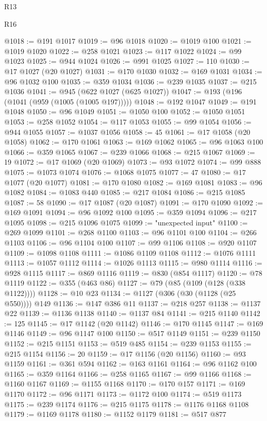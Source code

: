 \begin{lexlean}{R13}
\begin{lexlean}{R16}
\begin{coremodule}
{{{{{{{{{{{{{{{{{{{{{{{{{{{{{{{{{{{{{{{{{{{{{{{{{{{{{{{{{{{{{{{{{{{{{{{{{{{{{{{{{{{{{{{{{{{{{{{{{{{{{{{{{{{{{{{{{@1018 := @191 @1017
@1019 := @96 @1018
@1020 := @1019 @100
@1021 := @1019 @1020
@1022 := @258 @1021
@1023 := @117 @1022
@1024 := @99 @1023
@1025 := @944 @1024
@1026 := @991 @1025
@1027 := 110
@1030 := @17 @1027 (@20 @1027)
@1031 := @170 @1030
@1032 := @169 @1031
@1034 := @96 @1032 @100
@1035 := @359 @1034
@1036 := @239 @1035
@1037 := @215 @1036
@1041 := @945 (@622 @1027 (@625 @1027))
@1047 := @193 (@196 (@1041 (@959 (@1005 (@1005 @197)))))
@1048 := @192 @1047
@1049 := @191 @1048
@1050 := @96 @1049
@1051 := @1050 @100
@1052 := @1050 @1051
@1053 := @258 @1052
@1054 := @117 @1053
@1055 := @99 @1054
@1056 := @944 @1055
@1057 := @1037 @1056
@1058 := 45
@1061 := @17 @1058 (@20 @1058)
@1062 := @170 @1061
@1063 := @169 @1062
@1065 := @96 @1063 @100
@1066 := @359 @1065
@1067 := @239 @1066
@1068 := @215 @1067
@1069 := 19
@1072 := @17 @1069 (@20 @1069)
@1073 := @93 @1072
@1074 := @99 @888
@1075 := @1073 @1074
@1076 := @1068 @1075
@1077 := 47
@1080 := @17 @1077 (@20 @1077)
@1081 := @170 @1080
@1082 := @169 @1081
@1083 := @96 @1082
@1084 := @1083 @440
@1085 := @217 @1084
@1086 := @215 @1085
@1087 := 58
@1090 := @17 @1087 (@20 @1087)
@1091 := @170 @1090
@1092 := @169 @1091
@1094 := @96 @1092 @100
@1095 := @359 @1094
@1096 := @217 @1095
@1098 := @215 @1096 @1075
@1099 := "unexpected input"
@1100 := @269 @1099
@1101 := @268 @1100
@1103 := @96 @1101 @100
@1104 := @266 @1103
@1106 := @96 @1104 @100
@1107 := @99 @1106
@1108 := @920 @1107
@1109 := @1098 @1108
@1111 := @1086 @1109 @1108
@1112 := @1076 @1111
@1113 := @1057 @1112
@1114 := @1026 @1113
@1115 := @980 @1114
@1116 := @928 @1115
@1117 := @869 @1116
@1119 := @830 (@854 @1117)
@1120 := @78 @1119
@1122 := @355 (@463 @86)
@1127 := @79 (@85 (@109 (@128 (@338 @1122))))
@1128 := @10 @23
@1134 := @1127 (@306 (@30 (@1128 (@25 @550)))) @149
@1136 := @147 @386 @11
@1137 := @218 @257
@1138 := @1137 @22
@1139 := @1136 @1138
@1140 := @1137 @84
@1141 := @215 @1140
@1142 := 125
@1145 := @17 @1142 (@20 @1142)
@1146 := @170 @1145
@1147 := @169 @1146
@1149 := @96 @1147 @100
@1150 := @517 @1149
@1151 := @239 @1150
@1152 := @215 @1151
@1153 := @519 @485
@1154 := @239 @1153
@1155 := @215 @1154
@1156 := 20
@1159 := @17 @1156 (@20 @1156)
@1160 := @93 @1159
@1161 := @361 @594
@1162 := @163 @1161
@1164 := @96 @1162 @100
@1165 := @359 @1164
@1166 := @258 @1165
@1167 := @99 @1166
@1168 := @1160 @1167
@1169 := @1155 @1168
@1170 := @170 @157
@1171 := @169 @1170
@1172 := @96 @1171
@1173 := @1172 @100
@1174 := @519 @1173
@1175 := @239 @1174
@1176 := @215 @1175
@1178 := @1176 @1168 @1108
@1179 := @1169 @1178
@1180 := @1152 @1179
@1181 := @517 @877
}}}}}}}}}}}}}}}}}}}}}}}}}}}}}}}}}}}}}}}}}}}}}}}}}}}}}}}}}}}}}}}}}}}}}}}}}}}}}}}}}}}}}}}}}}}}}}}}}}}}}}}}}}}}}}}}}
\end{coremodule}
\end{lexlean}
\end{lexlean}
